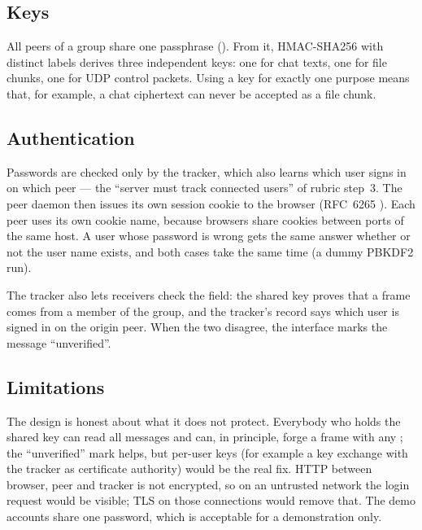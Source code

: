 \subsection{Keys}
All peers of a group share one passphrase (). From it, HMAC-SHA256 with distinct
labels derives three independent keys: one for chat texts, one for file chunks, one for UDP control
packets. Using a key for exactly one purpose means that, for example, a chat ciphertext can never be
accepted as a file chunk.


\subsection{Authentication}
Passwords are checked only by the tracker, which also learns which user signs in on which peer --- the
``server must track connected users'' of rubric step~3. The peer daemon then issues its own session
cookie to the browser (RFC~6265 \cite{rfc6265}). Each peer uses its own cookie name, because browsers
share cookies between ports of the same host. A user whose password is wrong gets the same answer
whether or not the user name exists, and both cases take the same time (a dummy PBKDF2 run).

The tracker also lets receivers check the  field: the shared key proves that a frame
comes from a member of the group, and the tracker's record says which user is signed in on the
origin peer. When the two disagree, the interface marks the message ``unverified''.

\subsection{Limitations}
The design is honest about what it does not protect. Everybody who holds the shared key can read all
messages and can, in principle, forge a frame with any ; the ``unverified'' mark helps,
but per-user keys (for example a key exchange with the tracker as certificate authority) would be the
real fix. HTTP between browser, peer and tracker is not encrypted, so on an untrusted network the
login request would be visible; TLS on those connections would remove that. The demo accounts share
one password, which is acceptable for a demonstration only.
